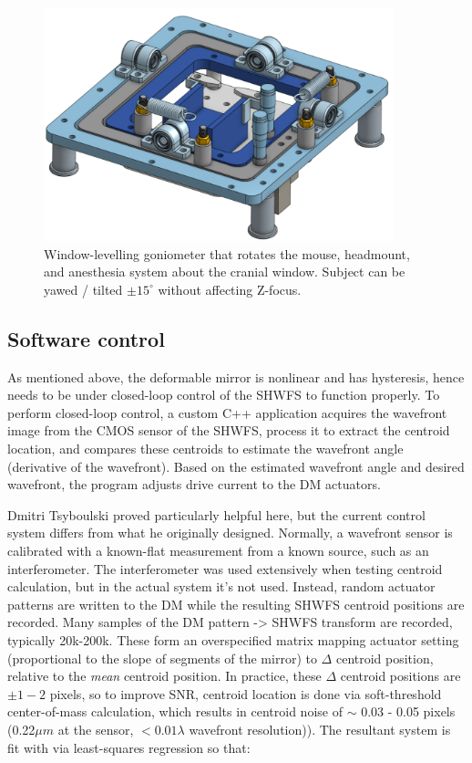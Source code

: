 \documentclass[a4paper,12pt]{article}
\begin{document}
\begin{figure}
\label{window_level}
\centering
\includegraphics[width=4in]{CAD_window_levelling.png}
\caption{Window-levelling goniometer that rotates the mouse, headmount, and anesthesia system about the cranial window.
	Subject can be yawed / tilted $ \pm 15^{\circ}$ without affecting Z-focus.
}
\end{figure}

\subsection{Software control}

As mentioned above, the deformable mirror is nonlinear and has hysteresis, hence needs to be under closed-loop control of the SHWFS to function properly.  To perform closed-loop control, a custom C++ application acquires the wavefront image from the CMOS sensor of the SHWFS, process it to extract the centroid location, and compares these centroids to estimate the wavefront angle (derivative of the wavefront).  Based on the estimated wavefront angle and desired wavefront, the program adjusts drive current to the DM actuators.  

Dmitri Tsyboulski proved particularly helpful here, but the current control system differs from what he originally designed.  Normally, a wavefront sensor is calibrated with a known-flat measurement from a known source, such as an interferometer.  The interferometer was used extensively when testing centroid calculation, but in the actual system it's not used.  Instead, random actuator patterns are written to the DM while the resulting SHWFS centroid positions are recorded.  Many samples of the DM pattern -> SHWFS transform are recorded, typically 20k-200k.  These form an overspecified matrix mapping actuator setting (proportional to the slope of segments of the mirror) to $\Delta$ centroid position, relative to the \textsl{mean} centroid position.  In practice, these $\Delta$ centroid positions are $\pm 1-2$ pixels, so to improve SNR, centroid location is done via soft-threshold center-of-mass calculation, which results in centroid noise of $\sim$ 0.03 - 0.05 pixels (0.22$\mu m$ at the sensor, $< 0.01 \lambda $ wavefront resolution)).  The resultant system is fit with via least-squares regression so that: 
\end{document}
